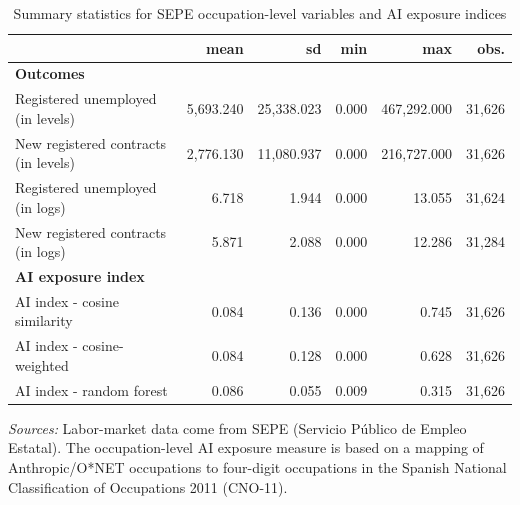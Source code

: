 \begin{table}[H]
\centering
\caption{Summary statistics for SEPE occupation-level variables and AI exposure indices}
\label{tab:summary_statistics}
\footnotesize
\begin{tabular}{lrrrrr}
\toprule
 & mean & sd & min & max & obs. \\
\midrule
\textbf{Outcomes} & & & & & \\
\hspace{0.3cm} Registered unemployed (in levels) & 5,693.240 & 25,338.023 & 0.000 & 467,292.000 & 31,626 \\
\hspace{0.3cm} New registered contracts (in levels) & 2,776.130 & 11,080.937 & 0.000 & 216,727.000 & 31,626 \\
\hspace{0.3cm} Registered unemployed (in logs) & 6.718 & 1.944 & 0.000 & 13.055 & 31,624 \\
\hspace{0.3cm} New registered contracts (in logs) & 5.871 & 2.088 & 0.000 & 12.286 & 31,284 \\
\textbf{AI exposure index} & & & & & \\
\hspace{0.3cm} AI index - cosine similarity & 0.084 & 0.136 & 0.000 & 0.745 & 31,626 \\
\hspace{0.3cm} AI index - cosine-weighted & 0.084 & 0.128 & 0.000 & 0.628 & 31,626 \\
\hspace{0.3cm} AI index - random forest & 0.086 & 0.055 & 0.009 & 0.315 & 31,626 \\
\bottomrule
\end{tabular}
\begin{tablenotes}
\small
\item \textit{Sources:} Labor-market data come from SEPE (Servicio Público de Empleo Estatal). The occupation-level AI exposure measure is based on a mapping of Anthropic/O*NET occupations to four-digit occupations in the Spanish National Classification of Occupations 2011 (CNO-11).
\end{tablenotes}
\end{table}
